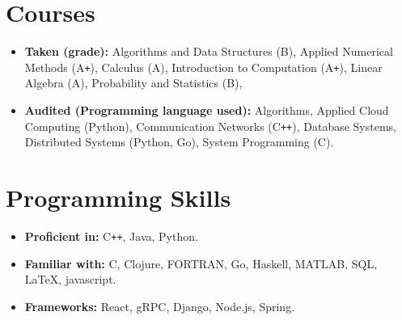 \documentclass[11pt,a4paper,sans]{moderncv}        %
\begin{document}
\vspace{-5pt}
\section{Courses}
\vspace{-5pt}
\begin{itemize}\small
	\item \textbf{Taken (grade):}
	      Algorithms and Data Structures (B),
	      Applied Numerical Methods (A\texttt{+}),
	      Calculus (A),
	      Introduction to Computation (A\texttt{+}),
	      Linear Algebra (A),
	      Probability and Statistics (B),
	\item \textbf{Audited (Programming language used):}
	      Algorithms,
	      Applied Cloud Computing (Python),
	      Communication Networks (C\texttt{++}),
	      Database Systems,
	      Distributed Systems (Python, Go),
	      System Programming (C).
\end{itemize}

\vspace{-5pt}
\section{Programming Skills}
\vspace{-5pt}
\begin{itemize}
	\item \textbf{Proficient in:}
	      C\texttt{++}, 
	      Java,
	      Python.
	\item \textbf{Familiar with:}
	      C,
	      Clojure,
	      FORTRAN,
	      Go,
	      Haskell,
	      MATLAB,
	      SQL,
	      \LaTeX,
	      javascript.
	\item \textbf{Frameworks:}
	      React,
	      gRPC,
	      Django,
	      Node.js, 
	      Spring.
\end{itemize}

% 
% 
\end{document}
